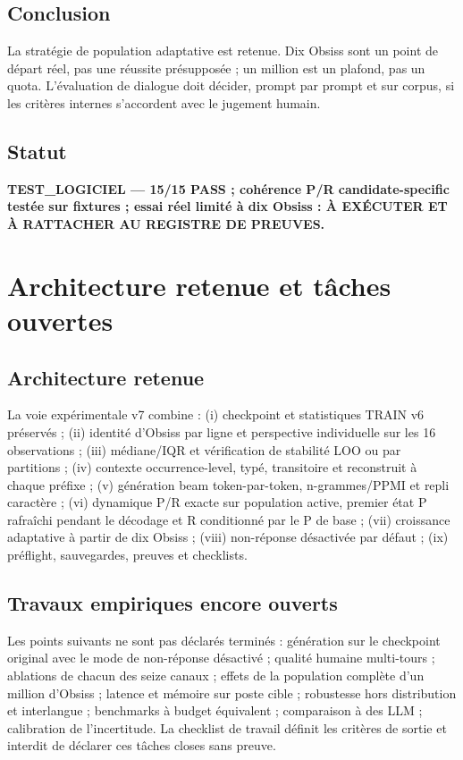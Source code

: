 \documentclass[11pt,a4paper]{report}
\begin{document}
\section{Conclusion}
La stratégie de population adaptative est retenue. Dix Obsiss sont un point de départ réel, pas une réussite présupposée ; un million est un plafond, pas un quota. L'évaluation de dialogue doit décider, prompt par prompt et sur corpus, si les critères internes s'accordent avec le jugement humain.
\section{Statut}
\textbf{TEST\_LOGICIEL — 15/15 PASS ; cohérence P/R candidate-specific testée sur fixtures ; essai réel limité à dix Obsiss : À EXÉCUTER ET À RATTACHER AU REGISTRE DE PREUVES.}

\chapter{Architecture retenue et tâches ouvertes}
\section{Architecture retenue}
La voie expérimentale v7 combine : (i) checkpoint et statistiques TRAIN v6 préservés ; (ii) identité d'Obsiss par ligne et perspective individuelle sur les 16 observations ; (iii) médiane/IQR et vérification de stabilité LOO ou par partitions ; (iv) contexte occurrence-level, typé, transitoire et reconstruit à chaque préfixe ; (v) génération beam token-par-token, n-grammes/PPMI et repli caractère ; (vi) dynamique P/R exacte sur population active, premier état P rafraîchi pendant le décodage et R conditionné par le P de base ; (vii) croissance adaptative à partir de dix Obsiss ; (viii) non-réponse désactivée par défaut ; (ix) préflight, sauvegardes, preuves et checklists.

\section{Travaux empiriques encore ouverts}
Les points suivants ne sont pas déclarés terminés : génération sur le checkpoint original avec le mode de non-réponse désactivé ; qualité humaine multi-tours ; ablations de chacun des seize canaux ; effets de la population complète d'un million d'Obsiss ; latence et mémoire sur poste cible ; robustesse hors distribution et interlangue ; benchmarks à budget équivalent ; comparaison à des LLM ; calibration de l'incertitude. La checklist de travail définit les critères de sortie et interdit de déclarer ces tâches closes sans preuve.
\end{document}
